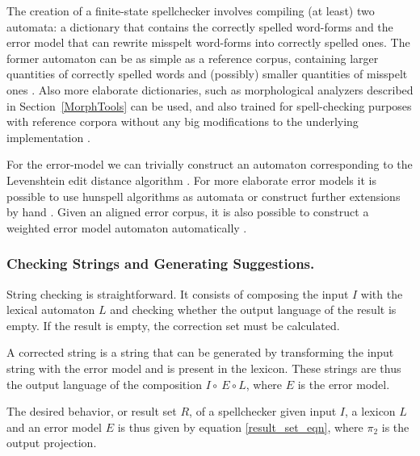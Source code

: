\documentclass{llncs}
\begin{document}
The creation of a finite-state spellchecker involves compiling (at least) two
automata: a dictionary that contains the correctly spelled word-forms and the
error model that can rewrite misspelt word-forms into correctly spelled ones.
The former automaton can be as simple as a reference corpus, containing larger
quantities of correctly spelled words and (possibly) smaller quantities of
misspelt ones \cite{norvig/2010}. Also more elaborate dictionaries, such as
morphological analyzers described in Section~\ref{MorphTools} can be used, and also
trained for spell-checking purposes with reference corpora without any big
modifications to the underlying implementation \cite{pirinen/2010/lrec}.

For the error-model we can trivially construct an automaton corresponding to
the Levenshtein edit distance algorithm \cite{oflazer/1996,agata/2002}. For more elaborate error models
it is possible to use hunspell algorithms as automata \cite{pirinen/2010/il} or
construct further extensions by hand \cite{pirinen/2010/lrec}. Given an
aligned error corpus, it is also possible to construct a weighted error model
automaton automatically \cite{brill/2000}.

\subsubsection{Checking Strings and Generating Suggestions.}

String checking is straight\-forward. It consists of composing the
input $I$ with the lexical automaton $L$ and checking whether the
output language of the result is empty. If the result is empty, the
correction set must be calculated.


A corrected string is a string that can be generated by transforming the
input string with the error model and is present in the lexicon.
These strings are thus the output language of the composition
$I \circ \ E \circ L$, where $E$ is the error model.

The desired behavior, or result set $R$, of a spellchecker given input $I$, a
lexicon $L$ and an error model $E$ is thus given by equation \ref{result_set_eqn},
where $\pi_2$ is the output projection.
\end{document}
